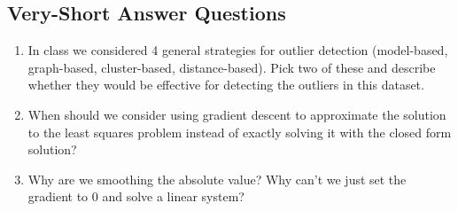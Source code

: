 \documentclass{article}
\def\blu#1{{\color{blu}#1}}
\def\enum#1{\begin{enumerate}#1\end{enumerate}}
\begin{document}
\subsection{Very-Short Answer Questions}

\blu{
\enum{
\item In class we considered 4 general strategies for outlier detection (model-based, graph-based, cluster-based, distance-based). Pick two of these and describe whether they would be effective for detecting the outliers in this dataset.
\item When should we consider using gradient descent to approximate the solution to the least squares problem instead of exactly solving it with the closed form solution? 
\item Why are we smoothing the absolute value? Why can't we just set the gradient to 0 and solve a linear system?
}}
\end{document}
